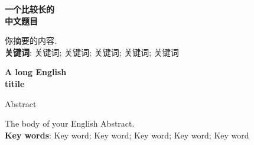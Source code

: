 \pagestyle{all}


\fontsize{12pt}{18pt}\selectfont \setcounter{page}{1}
\begin{center} 
	{\fontsize{15.75pt}{13pt}\selectfont\bf 一个比较长的\\中文题目}
\end{center}
\begin{center}
{\fontsize{15.75pt}{13pt}\selectfont{\bf 摘~要}} \vspace{1.0cm}
\end{center}

你摘要的内容.\\
\textbf{\hei 关键词}: 关键词;  关键词;  关键词;  关键词; 关键词

\newpage
\fontsize{12pt}{18pt}\selectfont 
\begin{center} {\fontsize{15.75pt}{13pt}\selectfont\bf
A long English \\ titile}\end{center}
\begin{center}
{\large Abstract} \vspace{1.0cm}
\end{center}
The body of your English Abstract.\\
\textbf{Key words}: Key word; Key word; Key word; Key word; Key word
\newpage
